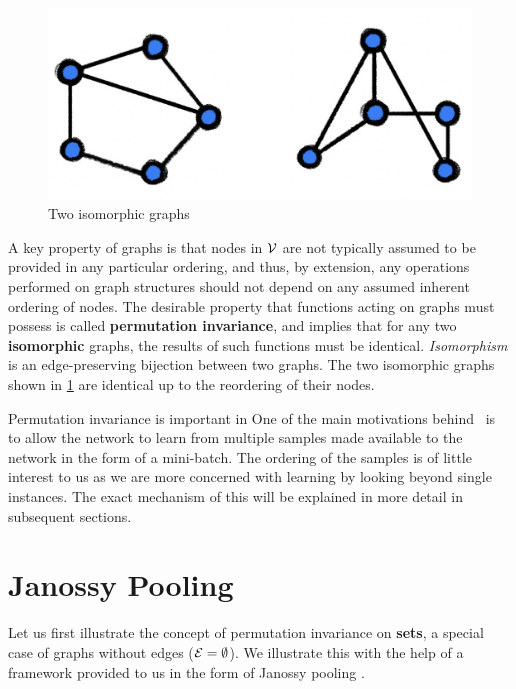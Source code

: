 \begin{figure}
    \centering
    \includegraphics[scale=0.15]{chapters/assets/graph-figs/mn_isomorphic.png}
    \caption{Two isomorphic graphs}
    \label{fig:graph-isomorphism}
\end{figure}
A key property of graphs is that nodes in $\mathcal{V}$ are not typically assumed to be provided in any particular ordering, and thus, by extension, any operations performed on graph structures should not depend on any assumed inherent ordering of nodes. The desirable property that functions acting on graphs must possess is called \textbf{permutation invariance}, and implies that for any two \textbf{isomorphic} graphs, the results of such functions must be identical. {\em Isomorphism} is an edge-preserving bijection between two graphs. The two isomorphic graphs shown in \cref{fig:graph-isomorphism} are identical up to the reordering of their nodes.

Permutation invariance is important in  One of the main motivations behind \samptr\ is to allow the network to learn from multiple samples made available to the network in the form of a mini-batch. The ordering of the samples is of little interest to us as we are more concerned with learning by looking beyond single instances. The exact mechanism of this will be explained in more detail in subsequent sections.



\section{Janossy Pooling}
Let us first illustrate the concept of permutation invariance on \textbf{sets}, a special case of graphs without edges ($\mathcal{E}=\emptyset$). We illustrate this with the help of a framework provided to us in the form of Janossy pooling \parencite{Murphy2018}.

